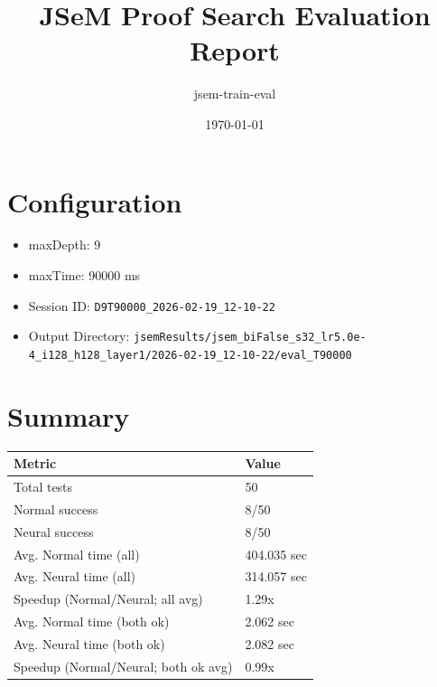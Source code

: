 \documentclass[a4paper,10pt]{article}
\title{JSeM Proof Search Evaluation Report}
\author{jsem-train-eval}
\date{\today}
\begin{document}
\maketitle

\section{Configuration}
\begin{itemize}
\item maxDepth: 9
\item maxTime: 90000 ms
\item Session ID: \texttt{D9T90000\_2026-02-19\_12-10-22}
\item Output Directory: \texttt{jsemResults/jsem\_biFalse\_s32\_lr5.0e-4\_i128\_h128\_layer1/2026-02-19\_12-10-22/eval\_T90000}
\end{itemize}

\section{Summary}
\begin{tabular}{ll}
\toprule
\textbf{Metric} & \textbf{Value} \\
\midrule
Total tests & 50 \\
Normal success & 8/50 \\
Neural success & 8/50 \\
\midrule
Avg. Normal time (all) & 404.035 sec \\
Avg. Neural time (all) & 314.057 sec \\
Speedup (Normal/Neural; all avg) & 1.29x \\
Avg. Normal time (both ok) & 2.062 sec \\
Avg. Neural time (both ok) & 2.082 sec \\
Speedup (Normal/Neural; both ok avg) & 0.99x \\
\bottomrule
\end{tabular}
\end{document}
